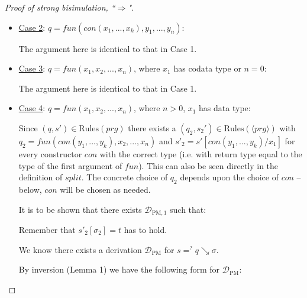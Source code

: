 \documentclass[11pt]{article} %
\begin{document}
\begin{proof}[Proof of strong bisimulation, ``$\Rightarrow$"]
\begin{enumerate}
\begin{itemize}
Then there is a $(q, s')$ in Rules$(\langle prg \rangle)$ as well as in Rules$(prg)$, since $split$ doesn't change rules where the copattern has this form. This can be seen directly in the definition of $split$.

Thus, set $q_2 := q$. It follows that $s'_2 = s', \sigma_2 = \sigma$ and finally $s'_2[\sigma_2] = s'[\sigma] = t$.

\item \underline{Case 2}: $q = fun(con(x_1, ..., x_k), y_1, ..., y_n)$:

The argument here is identical to that in Case 1.

\item \underline{Case 3}: $q = fun(x_1, x_2, ..., x_n)$, where $x_1$ has codata type or $n = 0$:

The argument here is identical to that in Case 1.

\item \underline{Case 4}: $q = fun(x_1, x_2, ..., x_n)$, where $n > 0$, $x_1$ has data type:

Since $(q, s') \in \textrm{Rules}(prg)$ there exists a $(q_2, s_2') \in \textrm{Rules}(\langle prg \rangle)$ with $q_2 = fun(con(y_1, ..., y_k), x_2, ..., x_n)$ and $s'_2 = s'[con(y_1, ..., y_k) / x_1]$ for every constructor $con$ with the correct type (i.e. with return type equal to the type of the first argument of $fun$). This can also be seen directly in the definition of $split$. The concrete choice of $q_2$ depends upon the choice of $con$ -- below, $con$ will be chosen as needed.

It is to be shown that there exists $\mathcal{D}_{\textrm{PM}, 1}$ such that:

\begin{prooftree}
\end{prooftree}

Remember that $s'_2[\sigma_2] = t$ has to hold.

We know there exists a derivation $\mathcal{D}_{\textrm{PM}}$ for $s =^? q \searrow \sigma$.

By inversion (Lemma 1) we have the following form for $\mathcal{D}_{\textrm{PM}}$:

\begin{prooftree}
\end{prooftree}


\end{itemize}
\end{enumerate}
\end{proof}
\end{document}
